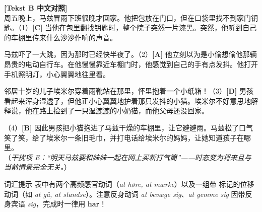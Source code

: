 \begin{transbox}
\small
\textbf{\color{NCDTeal}[Tekst B 中文对照]}\\
周五晚上，马兹冒雨下班很晚才回家。他把包放在门口，但在口袋里找不到家门钥匙。（1）\textbf{[C]} 当他在包里翻找钥匙时，整个院子突然一片漆黑。突然，他听到自己的车棚里传来什么沙沙作响的声音。

马兹吓了一大跳，因为那时已经快半夜了。（2）\textbf{[A]} 他立刻以为是小偷想偷他那辆昂贵的电动自行车。在他慢慢靠近车棚门时，他感觉到自己的手有点发抖。他打开手机照明灯，小心翼翼地往里看。

邻居十岁的儿子埃米尔穿着雨靴站在那里，怀里抱着一个小纸箱！（3）\textbf{[D]} 男孩看起来浑身湿透了，但他正小心翼翼地护着那只发抖的小猫。埃米尔不好意思地解释说，他在路上捡到了一只湿漉漉的小奶猫，而他父母还没回家。

（4）\textbf{[B]} 因此男孩把小猫抱进了马兹干燥的车棚里，让它避避雨。马兹松了口气笑了笑，给了埃米尔一条旧毛巾，并打电话给埃米尔的妈妈，让她知道孩子在哪里。\\
（\textit{干扰项 E：“明天马兹要和妹妹一起在网上买新打气筒”——时态变为将来且与当前情景完全无关。}）
\end{transbox}


\begin{tipbox}{词汇提示}
表中有两个高频感官动词（\textit{at høre, at mærke}）以及一组带 \dabold{[er]} 标记的位移动词（如 \textit{at gå, at standse}）。注意反身动词 \textit{at bevæge sig}、\textit{at gemme sig} 因带反身宾语 \textit{sig}，完成时一律用 \textbf{har}！
\end{tipbox}

